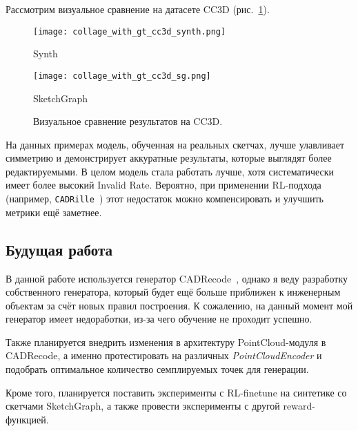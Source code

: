Рассмотрим визуальное сравнение на датасете CC3D (рис.~\ref{fig:datasets1}).

\begin{figure}[h!]
    \centering
    \texttt{[image: collage\_with\_gt\_cc3d\_synth.png]}
    \caption*{Synth}
    \vspace{1em}
    \texttt{[image: collage\_with\_gt\_cc3d\_sg.png]}
    \caption*{SketchGraph}
    \caption{Визуальное сравнение результатов на CC3D.}
    \label{fig:datasets1}
\end{figure}

На данных примерах модель, обученная на реальных скетчах, лучше улавливает симметрию и демонстрирует аккуратные результаты, которые выглядят более редактируемыми.
В целом модель стала работать лучше, хотя систематически имеет более высокий Invalid Rate.
Вероятно, при применении RL-подхода (например, \texttt{CADRille}~\cite{kolodiazhnyi25_cadrille}) этот недостаток можно компенсировать и улучшить метрики ещё заметнее.

\subsection{Будущая работа}

В данной работе используется генератор CADRecode~\cite{rukhovich24_cadrecode}, однако я веду разработку собственного генератора, который будет ещё больше приближен к инженерным объектам за счёт новых правил построения.
К сожалению, на данный момент мой генератор имеет недоработки, из-за чего обучение не проходит успешно.

Также планируется внедрить изменения в архитектуру PointCloud-модуля в CADRecode, а именно протестировать на различных \textit{PointCloudEncoder} и подобрать оптимальное количество семплируемых точек для генерации.

Кроме того, планируется поставить эксперименты с RL-finetune на синтетике со скетчами SketchGraph, а также провести эксперименты с другой reward-функцией.

\newpage